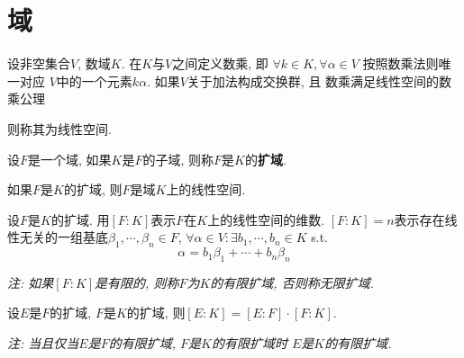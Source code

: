 \section{域}

\begin{definition}[线性空间]
    设非空集合\(V\), 数域\(K\). 在\(K\)与\(V\)之间定义数乘, 即
    \(\forall k \in K, \forall \alpha \in V\) 按照数乘法则唯一对应
    \(V\)中的一个元素\(k\alpha\). 如果\(V\)关于加法构成交换群, 且
    数乘满足线性空间的数乘公理
    
    则称其为线性空间.
\end{definition}

\begin{definition}[扩域]
    设\(F\)是一个域, 如果\(K\)是\(F\)的子域, 则称\(F\)是\(K\)的\textbf{扩域}.
\end{definition}

\begin{theorem}[扩域与线性空间]
    如果\(F\)是\(K\)的扩域, 则\(F\)是域\(K\)上的线性空间.
\end{theorem}

\begin{definition}[有限扩张]
    设\(F\)是\(K\)的扩域. 用\([F:K]\)表示\(F\)在\(K\)上的线性空间的维数.
    \([F:K] = n\)表示存在线性无关的一组基底\(\beta_1, \cdots, \beta_n \in F\),
    \(\forall \alpha \in V:\exists b_1, \cdots, b_n \in K\) s.t.
    \[\alpha = b_1 \beta_1 + \cdots + b_n \beta_n\] 
\end{definition}

\textit{注: 如果\([F:K]\)是有限的, 则称\(F\)为\(K\)的有限扩域, 否则称无限扩域.}

\begin{theorem}[扩张次数]
    设\(E\)是\(F\)的扩域, \(F\)是\(K\)的扩域, 则\([E:K]=[E:F]\cdot[F:K]\).
\end{theorem}

\textit{注: 当且仅当\(E\)是\(F\)的有限扩域, \(F\)是\(K\)的有限扩域时
\(E\)是\(K\)的有限扩域.}



